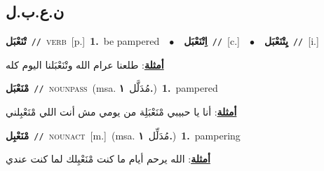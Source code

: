 \documentclass[10pt,a4paper,twoside]{article} %
\begin{document}
\begin{multicols}{2}
\vspace{-3mm}
\subsection*{\color{blue}\foreignlanguage{arabic}{ن.ع.ب.ل}\color{blue}{}} 

{\setlength\topsep{0pt}\textbf{\foreignlanguage{arabic}{تْنَعْبَل}}\ {\color{gray}\texttt{//}\color{black}}\ \textsc{verb}\ [p.]\ \textbf{1.}~be pampered\ \ $\bullet$\ \ \setlength\topsep{0pt}\textbf{\foreignlanguage{arabic}{اِتْنَعْبَل}}\ {\color{gray}\texttt{//}\color{black}}\ [c.]\ \ $\bullet$\ \ \setlength\topsep{0pt}\textbf{\foreignlanguage{arabic}{يِتْنَعْبَل}}\ {\color{gray}\texttt{//}\color{black}}\ [i.]\  \begin{flushright}\color{gray}\foreignlanguage{arabic}{\textbf{\underline{\foreignlanguage{arabic}{أمثلة}}}: طلعنا عرام الله وتْنَعْبَلنا اليوم كله}\end{flushright}\color{black}} \vspace{2mm}

{\setlength\topsep{0pt}\textbf{\foreignlanguage{arabic}{مْنَعْبَل}}\ {\color{gray}\texttt{//}\color{black}}\ \textsc{noun\textunderscore pass}\ \color{gray}(msa. \foreignlanguage{arabic}{مُدَلَّل}~\foreignlanguage{arabic}{\textbf{١.}})\color{black}\ \textbf{1.}~pampered\  \begin{flushright}\color{gray}\foreignlanguage{arabic}{\textbf{\underline{\foreignlanguage{arabic}{أمثلة}}}: أنا يا حبيبي مْنَعْبَلِة من يومي مش أنت اللي مْنَعْبِلني}\end{flushright}\color{black}} \vspace{2mm}

{\setlength\topsep{0pt}\textbf{\foreignlanguage{arabic}{مْنَعْبِل}}\ {\color{gray}\texttt{//}\color{black}}\ \textsc{noun\textunderscore act}\ [m.]\ \color{gray}(msa. \foreignlanguage{arabic}{مُدَلِّل}~\foreignlanguage{arabic}{\textbf{١.}})\color{black}\ \textbf{1.}~pampering\  \begin{flushright}\color{gray}\foreignlanguage{arabic}{\textbf{\underline{\foreignlanguage{arabic}{أمثلة}}}: الله يرحم أيام ما كنت مْنَعْبِلك لما كنت عندي}\end{flushright}\color{black}} \vspace{2mm}


\end{multicols}
\end{document}
